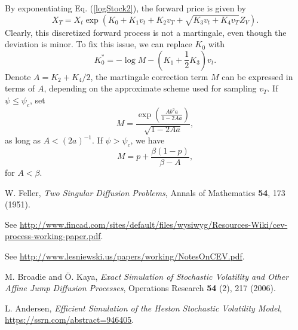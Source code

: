 \documentclass[12pt]{article}
\begin{document}
    By exponentiating Eq. (\ref{logStock2}), the forward price is given by
    \begin{equation}
      X_T = X_t \exp\left(K_0 + K_1v_t + K_2v_T + \sqrt{K_3v_t + K_4v_T}Z_V\right).
    \end{equation}
    Clearly, this discretized forward process is not a martingale, even though the deviation is minor. To fix this
    issue, we can replace $K_0$ with
    \begin{equation}
      K_0^* = -\log M -\left(K_1+\frac{1}{2}K_3\right)v_t.
    \end{equation}
    Denote $A=K_2+K_4/2$, the martingale correction term $M$ can be expressed in terms of $A$, depending on the
    approximate scheme used for sampling $v_T$. If $\psi\le\psi_c$, set
    \begin{equation}
      M=\frac{\displaystyle \exp\left(\frac{Ab^2a}{1-2Aa}\right)}{\sqrt{1-2Aa}},
    \end{equation}
    as long as $A<(2a)^{-1}$. If $\psi>\psi_c$, we have
    \begin{equation}
      M=p + \frac{\beta(1-p)}{\beta-A},
    \end{equation}
    for $A<\beta$.


\begin{thebibliography}{99}
    W. Feller, {\it Two Singular Diffusion Problems}, Annals of Mathematics {\bf 54}, 173 (1951).

    See \url{http://www.fincad.com/sites/default/files/wysiwyg/Resources-Wiki/cev-process-working-paper.pdf}.

    See \url{http://www.lesniewski.us/papers/working/NotesOnCEV.pdf}.

    M. Broadie and \"{O}. Kaya, {\it Exact Simulation of Stochastic Volatility and Other Affine Jump Diffusion Processes},
    Operations Research {\bf 54} (2), 217 (2006).

    L. Andersen, {\it Efficient Simulation of the Heston Stochastic Volatility Model}, \url{https://ssrn.com/abstract=946405}.

\end{thebibliography}
\end{document}
